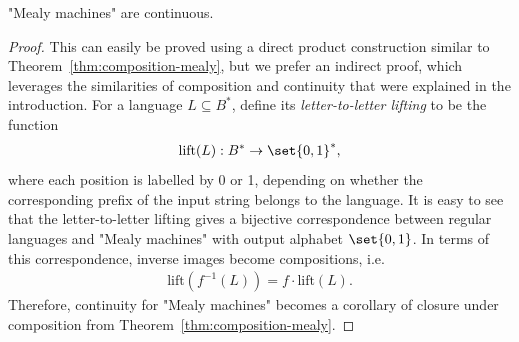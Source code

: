 \begin{theorem} 
    \label{thm:continuity-mealy}
    "Mealy machines" are continuous.
\end{theorem}
\begin{proof}
    This can easily be proved using a direct  product construction similar to Theorem~\ref{thm:composition-mealy}, but we prefer an indirect proof, which leverages the similarities of composition and continuity that were explained in the introduction.  For a  language $L \subseteq B^*$, define its \emph{letter-to-letter lifting} to be the function  
    \begin{align*}
\text{lift}(L): B^* \to \set{0,1}^*,
    \end{align*}
    where each position is labelled by 0 or 1, depending on whether the corresponding prefix  of the input string belongs to the language. It is easy to see that the letter-to-letter lifting gives a bijective correspondence between regular languages and "Mealy machines" with output alphabet $\set{0,1}$. In terms of this correspondence, inverse images become compositions, i.e.
    \begin{align*}
    \text{lift}(f^{-1}(L)) = f \cdot \text{lift}(L).
    \end{align*}
    Therefore, continuity for "Mealy machines" becomes a corollary of closure under composition from Theorem~\ref{thm:composition-mealy}.
\end{proof}





\exerciseheader






